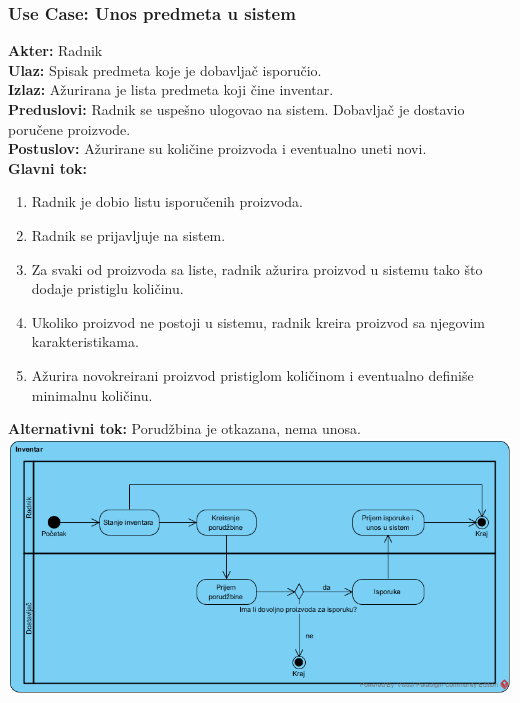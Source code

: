 \documentclass{article}
\begin{document}
\subsubsection{\textbf{Use Case}: Unos predmeta u sistem}
\textbf{Akter:} Radnik\\
\textbf{Ulaz:} Spisak predmeta koje je dobavljač isporučio.\\
\textbf{Izlaz:} Ažurirana je lista predmeta koji čine inventar.\\
\textbf{Preduslovi:} Radnik se uspešno ulogovao na sistem. Dobavljač je dostavio poručene proizvode.\\
\textbf{Postuslov:} Ažurirane su količine proizvoda i eventualno uneti novi.\\
\textbf{Glavni tok:} 

\begin{enumerate}
	\item Radnik je dobio listu isporučenih proizvoda.
	\item Radnik se prijavljuje na sistem.
	\item Za svaki od proizvoda sa liste, radnik ažurira proizvod u sistemu tako što dodaje pristiglu količinu.
	\item Ukoliko proizvod ne postoji u sistemu, radnik kreira proizvod sa njegovim karakteristikama.
	\item Ažurira novokreirani proizvod pristiglom količinom i eventualno definiše minimalnu količinu. 
\end{enumerate}
\textbf{Alternativni tok:} Porudžbina je otkazana, nema unosa.\\


\includegraphics[width=\textwidth]{SU_2_pregled_inventara_activity.png}

\end{document}
